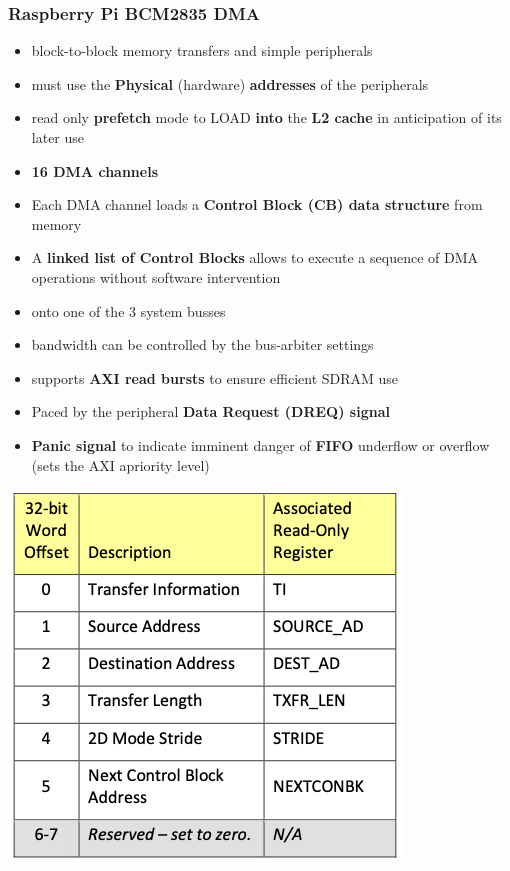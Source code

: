 \documentclass[
  10pt,
  a4paper,
]{article}
\providecommand{\tightlist}{%
  \setlength{\itemsep}{0pt}\setlength{\parskip}{0pt}}\usepackage{longtable,booktabs,array}
\begin{document}
\begin{multicols*}{2}
\subsubsection{Raspberry Pi BCM2835 DMA}\label{raspberry-pi-bcm2835-dma}

\begin{itemize}
\tightlist
\item
  block-to-block memory transfers and simple peripherals
\item
  must use the \textbf{Physical} (hardware) \textbf{addresses} of the
  peripherals
\item
  read only \textbf{prefetch} mode to LOAD \textbf{into} the \textbf{L2
  cache} in anticipation of its later use
\item
  \textbf{16 DMA channels}
\item
  Each DMA channel loads a \textbf{Control Block (CB) data structure}
  from memory
\item
  A \textbf{linked list of Control Blocks} allows to execute a sequence
  of DMA operations without software intervention
\item
  onto one of the 3 system busses
\item
  bandwidth can be controlled by the bus-arbiter settings
\item
  supports \textbf{AXI read bursts} to ensure efficient SDRAM use
\item
  Paced by the peripheral \textbf{Data Request (DREQ) signal}
\item
  \textbf{Panic signal} to indicate imminent danger of \textbf{FIFO}
  underflow or overflow (sets the AXI apriority level)
\end{itemize}

\begin{tcolorbox}[enhanced jigsaw, coltitle=black, toprule=.15mm, colframe=quarto-callout-note-color-frame, breakable, titlerule=0mm, title=\textcolor{quarto-callout-note-color}{\faInfo}\hspace{0.5em}{DMA Control Block}, toptitle=1mm, colback=white, leftrule=.75mm, bottomtitle=1mm, colbacktitle=quarto-callout-note-color!10!white, left=2mm, bottomrule=.15mm, rightrule=.15mm, arc=.35mm, opacityback=0, opacitybacktitle=0.6]

\includegraphics{images/performance/image-32.png}


\end{tcolorbox}
\end{multicols*}
\end{document}

